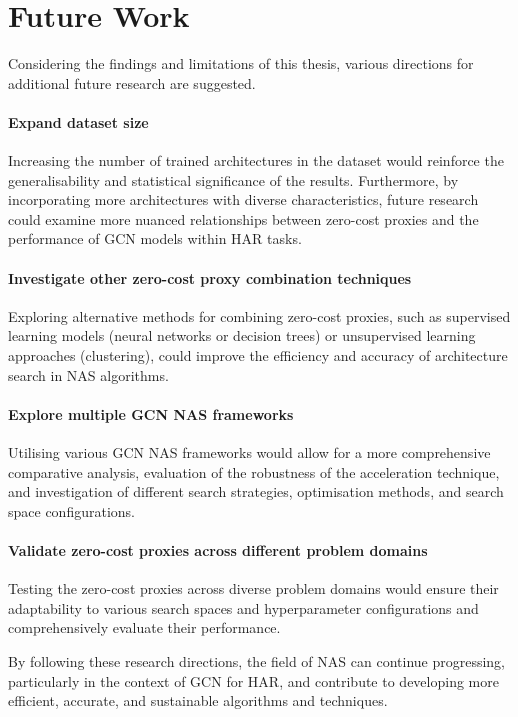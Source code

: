 \section{Future Work}

Considering the findings and limitations of this thesis, various directions for additional future research are suggested.

\paragraph{Expand dataset size}
Increasing the number of trained architectures in the dataset would reinforce the generalisability and statistical significance of the results. Furthermore, by incorporating more architectures with diverse characteristics, future research could examine more nuanced relationships between zero-cost proxies and the performance of \gls{GCN} models within \gls{HAR} tasks.

\paragraph{Investigate other zero-cost proxy combination techniques}
Exploring alternative methods for combining zero-cost proxies, such as supervised learning models (neural networks or decision trees) or unsupervised learning approaches (clustering), could improve the efficiency and accuracy of architecture search in \gls{NAS} algorithms.

\paragraph{Explore multiple GCN NAS frameworks}
Utilising various \gls{GCN} \gls{NAS} frameworks would allow for a more comprehensive comparative analysis, evaluation of the robustness of the acceleration technique, and investigation of different search strategies, optimisation methods, and search space configurations.

\paragraph{Validate zero-cost proxies across different problem domains}
Testing the zero-cost proxies across diverse problem domains would ensure their adaptability to various search spaces and hyperparameter configurations and comprehensively evaluate their performance.

By following these research directions, the field of \gls{NAS} can continue progressing, particularly in the context of \gls{GCN} for \gls{HAR}, and contribute to developing more efficient, accurate, and sustainable algorithms and techniques.

